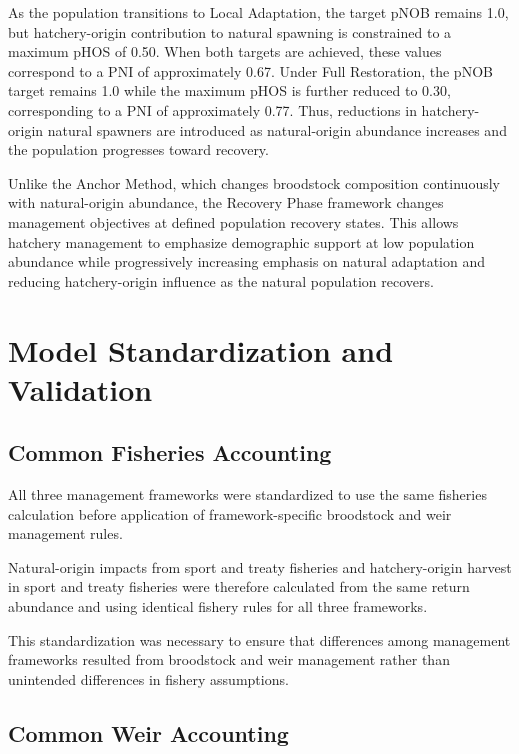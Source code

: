 \documentclass[12pt,letterpaper]{article}
\begin{document}
As the population transitions to Local Adaptation, the target pNOB remains
1.0, but hatchery-origin contribution to natural spawning is constrained to a
maximum pHOS of 0.50. When both targets are achieved, these values correspond
to a PNI of approximately 0.67. Under Full Restoration, the pNOB target remains
1.0 while the maximum pHOS is further reduced to 0.30, corresponding to a PNI
of approximately 0.77. Thus, reductions in hatchery-origin natural spawners
are introduced as natural-origin abundance increases and the population
progresses toward recovery.

Unlike the Anchor Method, which changes broodstock composition continuously
with natural-origin abundance, the Recovery Phase framework changes management
objectives at defined population recovery states. This allows hatchery
management to emphasize demographic support at low population abundance while
progressively increasing emphasis on natural adaptation and reducing
hatchery-origin influence as the natural population recovers.

\section{Model Standardization and Validation}\label{model-standardization-and-validation}

\subsection{Common Fisheries Accounting}\label{common-fisheries-accounting}

All three management frameworks were standardized to use the same fisheries
calculation before application of framework-specific broodstock and weir
management rules.

Natural-origin impacts from sport and treaty fisheries and hatchery-origin
harvest in sport and treaty fisheries were therefore calculated from the same
return abundance and using identical fishery rules for all three frameworks.

This standardization was necessary to ensure that differences among management
frameworks resulted from broodstock and weir management rather than unintended
differences in fishery assumptions.

\subsection{Common Weir Accounting}\label{common-weir-accounting}
\end{document}
